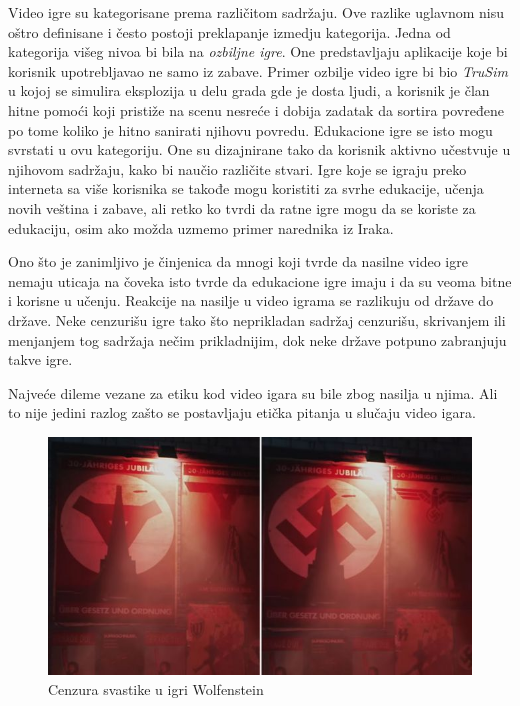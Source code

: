 \documentclass[a4paper]{article}
\begin{document}
Video igre su kategorisane prema različitom sadržaju. Ove razlike uglavnom nisu oštro definisane i često postoji
preklapanje izmedju kategorija. Jedna od kategorija višeg nivoa bi bila na {\em ozbiljne igre}. One predstavljaju aplikacije
koje bi korisnik upotrebljavao ne samo iz zabave. Primer ozbilje video igre bi bio {\em TruSim }
u kojoj se simulira eksplozija u delu grada gde je dosta ljudi, a korisnik je član hitne pomoći koji pristiže na scenu nesreće
i dobija zadatak da sortira povređene po tome koliko je hitno sanirati njihovu povredu. Edukacione igre se isto mogu svrstati u ovu kategoriju.
One su dizajnirane tako da korisnik aktivno učestvuje u njihovom sadržaju, kako bi naučio različite stvari. Igre koje se igraju 
preko interneta sa više korisnika se takođe mogu koristiti za svrhe edukacije, učenja novih veština i zabave,
ali retko ko tvrdi da ratne igre mogu da se koriste za edukaciju, osim ako možda uzmemo primer narednika iz Iraka.

Ono što je zanimljivo je činjenica da mnogi koji tvrde da nasilne video igre nemaju uticaja na čoveka isto tvrde
da edukacione igre imaju i da su veoma bitne i korisne u učenju. Reakcije na nasilje u video igrama se razlikuju
od države do države. Neke cenzurišu igre tako što neprikladan sadržaj cenzurišu, skrivanjem ili menjanjem tog 
sadržaja nečim prikladnijim, dok neke države potpuno zabranjuju takve igre.

Najveće dileme vezane za etiku kod video igara su bile zbog nasilja u njima. Ali to nije jedini razlog zašto se 
postavljaju etička pitanja u slučaju video igara. 

\begin{figure}[h!]
	\begin{center}
		\includegraphics[scale=0.6]{wolfensteinyoungblood.jpg}
	\end{center}
	\caption{Cenzura svastike u igri Wolfenstein}
\end{figure}
\end{document}

